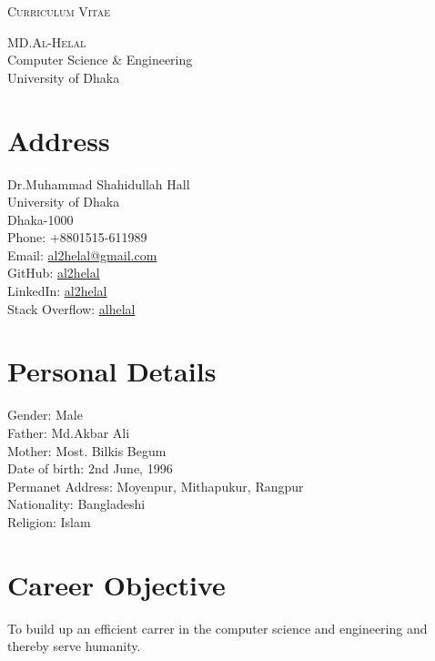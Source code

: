 \documentclass[a4paper]{article}
\begin{document}
\pagestyle{empty}

\begin{center}
\huge{\textsc{Curriculum Vitae}}
\vspace{\baselineskip}

\Large{\textsc{MD.Al-Helal}\\
Computer Science \& Engineering\\University of Dhaka}
\end{center}
\vspace{1.5\baselineskip}

\section{Address}

\begin{flushleft}
  Dr.Muhammad Shahidullah Hall\\
  University of Dhaka\\
  Dhaka-1000\\
  Phone: +8801515-611989\\
  Email: \href{mailto:al2helal@gmail.com}{al2helal@gmail.com}\\
  GitHub: \href{https://github.com/al2helal}{al2helal}\\
  LinkedIn: \href{https://www.linkedin.com/in/mdalhelal/}{al2helal}\\
  Stack Overflow: \href{https://stackoverflow.com/users/5697418/alhelal}{alhelal}
\end{flushleft}


\section{Personal Details}
\begin{flushleft}
  Gender: Male \\
  Father: Md.Akbar Ali\\
  Mother: Most. Bilkis Begum\\
  Date of birth: 2nd June, 1996 \\
  Permanet Address: Moyenpur, Mithapukur, Rangpur\\
  Nationality: Bangladeshi\\
  Religion: Islam\\
\end{flushleft}

\section{Career Objective}
\begin{CV}
\item To build up an efficient carrer in the computer science and engineering and thereby serve humanity.
  \end{CV}
\end{document}
